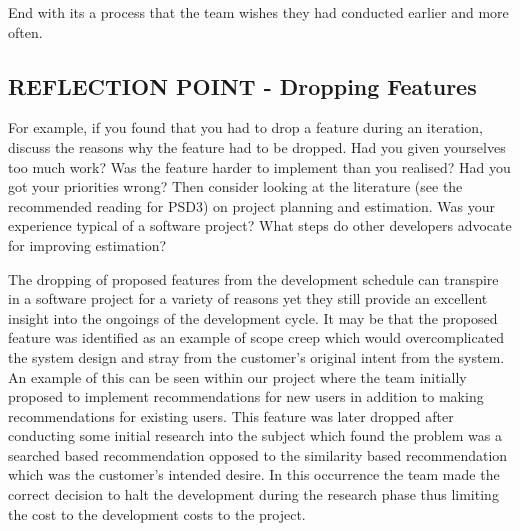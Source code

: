 \documentclass{l3proj}
\begin{document}
End with its a process that the team wishes they had conducted earlier and more often.


\subsection{REFLECTION POINT - Dropping Features}
\label{sec:droppingreflection}

For example, if you found that you had to drop a feature during an iteration, discuss the reasons why the feature had to be dropped. Had you given yourselves too much work? Was the feature harder to implement than you realised? Had you got your priorities wrong? Then consider looking at the literature (see the recommended reading for PSD3) on project planning and estimation. Was your experience typical of a software project? What steps do other developers advocate for improving estimation?


The dropping of proposed features from the development schedule can transpire in a software project for a variety of reasons yet they still provide an excellent insight into the ongoings of the development cycle. It may be that the proposed feature was identified as an example of scope creep which would overcomplicated the system design and stray from the customer's original intent from the system. An example of this can be seen within our project where the team initially proposed to implement recommendations for new users in addition to making recommendations for existing users. This feature was later dropped after conducting some initial research into the subject which found the problem was a searched based recommendation opposed to the similarity based recommendation which was the customer's intended desire. In this occurrence the team made the correct decision to halt the development during the research phase thus limiting the cost to the development costs to the project. 
\end{document}
